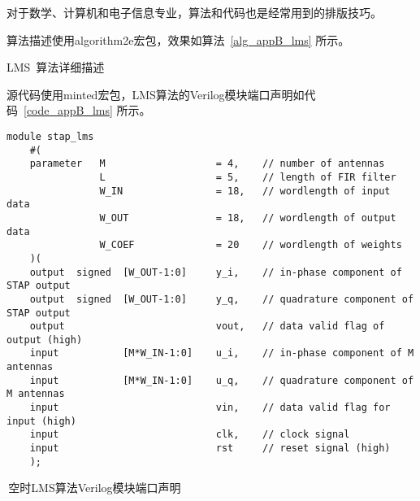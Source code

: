 

对于数学、计算机和电子信息专业，算法和代码也是经常用到的排版技巧。


算法描述使用algorithm2e宏包，效果如算法~\ref{alg_appB_lms} 所示。

\begin{algorithm}
\wuhao
	\IncMargin{2em}
	\DontPrintSemicolon
    \caption{LMS~算法详细描述}\label{alg_appB_lms}
\end{algorithm}

源代码使用minted宏包，LMS算法的Verilog模块端口声明如代码~\ref{code_appB_lms} 所示。

\begin{listing}
\begin{verbatim}
module stap_lms
    #(
    parameter   M                   = 4,    // number of antennas
                L                   = 5,    // length of FIR filter
                W_IN                = 18,   // wordlength of input data
                W_OUT               = 18,   // wordlength of output data
                W_COEF              = 20    // wordlength of weights
    )(
    output  signed  [W_OUT-1:0]     y_i,    // in-phase component of STAP output
    output  signed  [W_OUT-1:0]     y_q,    // quadrature component of STAP output
    output                          vout,   // data valid flag of output (high)
    input           [M*W_IN-1:0]    u_i,    // in-phase component of M antennas
    input           [M*W_IN-1:0]    u_q,    // quadrature component of M antennas
    input                           vin,    // data valid flag for input (high)
    input                           clk,    // clock signal
    input                           rst     // reset signal (high)
    );
\end{verbatim}
\caption{\,空时LMS算法Verilog模块端口声明}
\label{code_appB_lms}
\end{listing}


